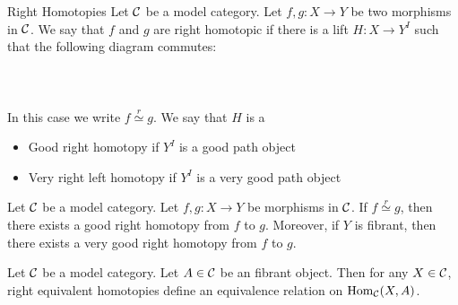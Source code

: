 \documentclass[a4paper]{article}
\begin{document}
\begin{defn}{Right Homotopies}{} Let $\mathcal{C}$ be a model category. Let $f,g:X\to Y$ be two morphisms in $\mathcal{C}$. We say that $f$ and $g$ are right homotopic if there is a lift $H:X\to Y^I$ such that the following diagram commutes: \\~\\
\\~\\
In this case we write $f\overset{r}{\simeq}g$. We say that $H$ is a 
\begin{itemize}
\item Good right homotopy if $Y^I$ is a good path object
\item Very right left homotopy if $Y^I$ is a very good path object
\end{itemize}
\end{defn}

\begin{prp}{}{} Let $\mathcal{C}$ be a model category. Let $f,g:X\to Y$ be morphisms in $\mathcal{C}$. If $f\overset{r}{\simeq}g$, then there exists a good right homotopy from $f$ to $g$. Moreover, if $Y$ is fibrant, then there exists a very good right homotopy from $f$ to $g$. 
\end{prp}

\begin{prp}{}{} Let $\mathcal{C}$ be a model category. Let $A\in\mathcal{C}$ be an fibrant object. Then for any $X\in\mathcal{C}$, right equivalent homotopies define an equivalence relation on $\operatorname{Hom}_{\mathcal{C}}(X,A)$. 
\end{prp}
\end{document}
